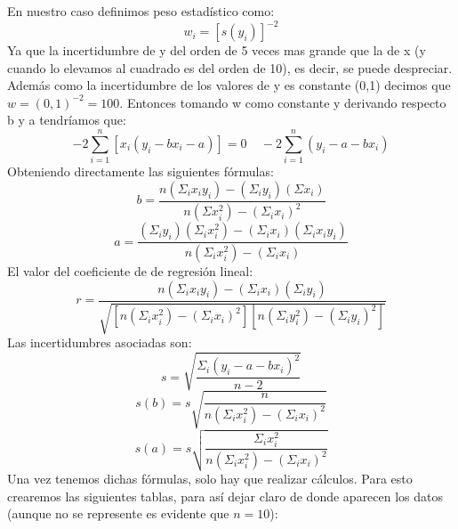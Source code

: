\documentclass[10pt,a4paper]{article}
\begin{document}
En nuestro caso definimos peso estadístico como:
\begin{equation}
w_i=[s(y_i)]^{-2} \label{peso estadístico}
\end{equation}
Ya que la incertidumbre de y del orden de 5 veces mas grande que la de x (y cuando lo elevamos al cuadrado es del orden de 10), es decir, se puede despreciar. Además como la incertidumbre de los valores de y es constante (0,1) decimos que $w=(0,1)^{-2}=100$. Entonces tomando w como constante y derivando respecto b y a tendríamos que:
\begin{equation}\label{minimos cuadrados}
-2\sum_{i=1}^n [x_i(y_i - bx_i-a)] = 0  \ \ \ \ \ -2\sum_{i=1}^n (y_i-a-bx_i)
\end{equation}
Obteniendo directamente las siguientes fórmulas:
\begin{equation}
b=\dfrac{n(\Sigma_i x_i y_i)-(\Sigma_i y_i)(\Sigma x_i)}{n(\Sigma x_i^2) -(\Sigma_i x_i)^2} \label{valor de b}
\end{equation}
\begin{equation}
a=\dfrac{ (\Sigma_i y_i)(\Sigma_i x_i^2)- (\Sigma_i x_i)(\Sigma_i x_iy_i)}{n(\Sigma_i x_i^2)-(\Sigma_i x_i)}\label{valor de a}
\end{equation}
El valor del coeficiente de de regresión lineal: 
\begin{equation}
r = \dfrac{n (\Sigma_i x_i y_i) - (\Sigma_i x_i)(\Sigma_i y_i)}{\sqrt{[n(\Sigma_i x_i^2)-(\Sigma_i x_i)^2][n(\Sigma_i y_i^2)-(\Sigma_i y_i)^2]}}
\end{equation}
Las incertidumbres asociadas son:
\begin{equation}
s=\sqrt{\dfrac{\Sigma_i (y_i-a-bx_i)^2}{n-2}}
\label{incertidumbre s}
\end{equation}
\begin{equation}
s(b)=s \sqrt{\dfrac{n}{n(\Sigma_i x_i^2)-(\Sigma_i x_i)^2}} 
\label{incertidumbre de b}
\end{equation}
\begin{equation}
s(a)=s \sqrt{\dfrac{\Sigma_i x_i^2}{n(\Sigma_i x_i^2)-(\Sigma_i x_i)^2} }
\label{incertidumbre de a}
\end{equation}
Una vez tenemos dichas fórmulas, solo hay que realizar cálculos. Para esto crearemos las siguientes tablas, para así dejar claro de donde aparecen los datos (aunque no se represente es evidente que $n=10$):
\end{document}
